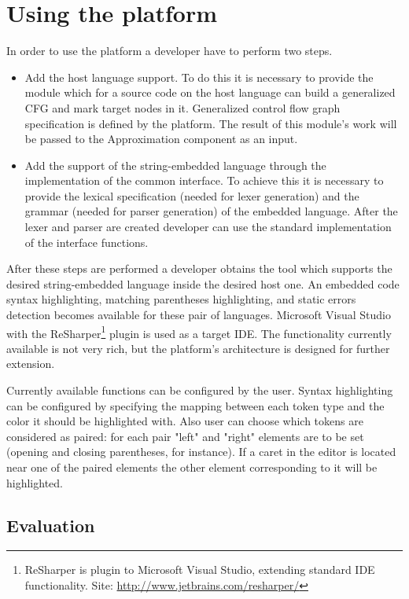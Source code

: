 \documentclass{sig-alternate-05-2015}
\begin{document}
\section{Using the platform}

In order to use the platform a developer have to perform two steps.
\begin{itemize}
\item Add the host language support. To do this it is necessary to provide the module which for a source code on the host language can build a generalized CFG and mark target nodes in it. Generalized control flow graph specification is defined by the platform. The result of this module's work will be passed to the Approximation component as an input.
\item Add the support of the string-embedded language through the implementation of the common interface. To achieve this it is necessary to provide the lexical specification (needed for lexer generation) and the grammar (needed for parser generation) of the embedded language. After the lexer and parser are created developer can use the standard implementation of the interface functions.
\end{itemize}

After these steps are performed a developer obtains the tool which supports the desired string-embedded language inside the desired host one. An embedded code syntax highlighting, matching parentheses highlighting, and static errors detection becomes available for these pair of languages. Microsoft Visual Studio with the ReSharper\footnote{ReSharper is plugin to Microsoft Visual Studio, extending standard IDE functionality. Site: \url{http://www.jetbrains.com/resharper/}} plugin is used as a target IDE. The functionality currently available is not very rich, but the platform's architecture is designed for further extension.

Currently available functions can be configured by the user. Syntax highlighting can be configured by specifying the mapping between each token type and the color it should be highlighted with. Also user can choose which tokens are considered as paired: for each pair "left" and "right" elements are to be set (opening and closing parentheses, for instance). If a caret in the editor is located near one of the paired elements the other element corresponding to it will be highlighted.

\subsection{Evaluation}
\end{document}
